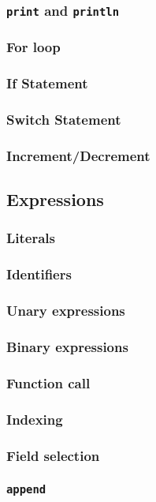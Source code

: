 \documentclass{article}
\begin{document}
\subsubsection*{\texttt{print} and \texttt{println}}
\subsubsection*{For loop}
\subsubsection*{If Statement}
\subsubsection*{Switch Statement}
\subsubsection*{Increment/Decrement}

\subsection*{Expressions}

\subsubsection*{Literals}
\subsubsection*{Identifiers}
\subsubsection*{Unary expressions}
\subsubsection*{Binary expressions}
\subsubsection*{Function call}
\subsubsection*{Indexing}
\subsubsection*{Field selection}
\subsubsection*{\texttt{append}}
\end{document}
